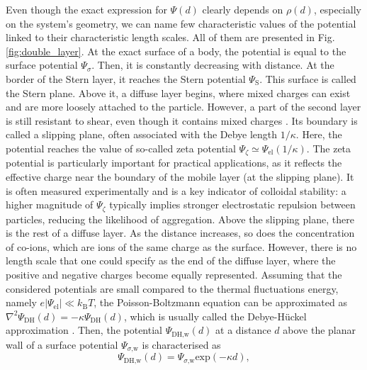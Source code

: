 \documentclass{master_thesis}
\begin{document}
Even though the exact expression for $\Psi(d)$ clearly depends on $\rho(d)$, especially on the system's geometry, we can name few characteristic values of the potential linked to their characteristic length scales. All of them are presented in Fig. \ref{fig:double_layer}. At the exact surface of a body, the potential is equal to the surface potential $\Psi_\sigma$. Then, it is constantly decreasing with distance. At the border of the Stern layer, it reaches the Stern potential $\Psi_{\textrm{S}}$. This surface is called the Stern plane. Above it, a diffuse layer begins, where mixed charges can exist and are more loosely attached to the particle. However, a part of the second layer is still resistant to shear, even though it contains mixed charges \cite{israelachvili_2011}. Its boundary is called a slipping plane, often associated with the Debye length $1/\kappa$. Here, the potential reaches the value of so-called zeta potential $\Psi_\zeta \simeq \Psi_{\textrm{el}}(1/\kappa)$. The zeta potential is particularly important for practical applications, as it reflects the effective charge near the boundary of the mobile layer (at the slipping plane). It is often measured experimentally and is a key indicator of colloidal stability: a higher magnitude of $\Psi_\zeta$ typically implies stronger electrostatic repulsion between particles, reducing the likelihood of aggregation. Above the slipping plane, there is the rest of a diffuse layer. As the distance increases, so does the concentration of co-ions, which are ions of the same charge as the surface. However, there is no length scale that one could specify as the end of the diffuse layer, where the positive and negative charges become equally represented. Assuming that the considered potentials are small compared to the thermal fluctuations energy, namely $e|\Psi_{\textrm{el}}| \ll k_{\textrm{B}} T$, the Poisson-Boltzmann equation can be approximated as $\nabla^2 \Psi_{\textrm{DH}}(d) = -\kappa \Psi_{\textrm{DH}}(d)$, which is usually called the Debye-Hückel approximation \cite{huckel_1924}. Then, the potential $\Psi_{\textrm{DH,w}}(d)$ at a distance $d$ above the planar wall of a surface potential $\Psi_{\sigma \textrm{,w}}$ is characterised as
\begin{equation}
    \Psi_{\textrm{DH,w}}(d) = \Psi_{\sigma \textrm{,w}} \textrm{exp} \left( -\kappa d \right),
\label{eqn:edl_potential_wall}
\end{equation}
\end{document}
